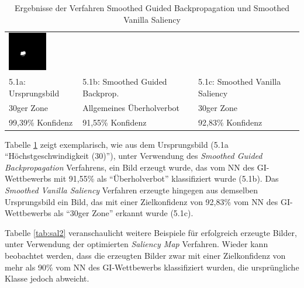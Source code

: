 \begin{table}
\begin{tabular}{p{4.5cm}p{4.5cm}p{4.5cm}}
		\includegraphics[width=\linewidth]{Images/AnPe/5_1_Rechts}\\ 
		5.1a: Ursprungsbild &5.1b: Smoothed Guided Backprop. &5.1c: Smoothed Vanilla Saliency \\
		30ger Zone & Allgemeines Überholverbot & 30ger Zone\\
		99,39\% Konfidenz & 91,55\% Konfidenz & 92,83\% Konfidenz\\
		
	\end{tabular} 

	\caption{Ergebnisse der Verfahren Smoothed Guided Backpropagation und Smoothed Vanilla Saliency}
	\label{tab:sal1}
\end{table}

Tabelle \ref{tab:sal1} zeigt exemplarisch, wie aus dem Ursprungsbild (5.1a "`Höchstgeschwindigkeit (30)"'), unter Verwendung des \textit{Smoothed Guided Backpropagation} Verfahrens, ein Bild erzeugt wurde, das vom \ac{NN} des \ac{GI}-Wettbewerbs mit 91,55\% als "`Überholverbot"' klassifiziert wurde (5.1b). 
Das \textit{Smoothed Vanilla Saliency} Verfahren erzeugte hingegen aus demselben Ursprungsbild ein Bild, das mit einer Zielkonfidenz von 92,83\% vom \ac{NN} des \ac{GI}-Wettbewerbs als "`30ger Zone"' erkannt wurde (5.1c).

Tabelle \ref{tab:sal2} veranschaulicht weitere Beispiele für erfolgreich erzeugte Bilder, unter Verwendung der optimierten \textit{Saliency Map} Verfahren. Wieder kann beobachtet werden, dass die erzeugten Bilder zwar mit einer Zielkonfidenz von mehr als 90\% vom \ac{NN} des \ac{GI}-Wettbewerbs klassifiziert wurden, die ursprüngliche Klasse jedoch abweicht.

